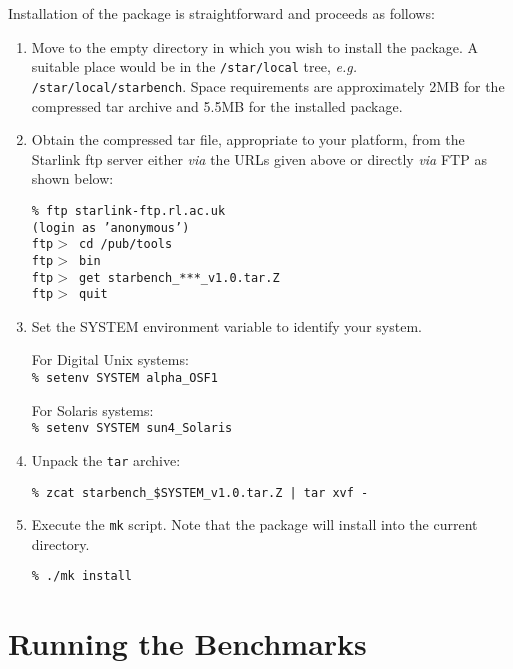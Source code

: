 \documentclass[11pt]{article}
\newcommand{\pkgver}     {v1.0}
\newcommand{\pkgftpdir}  {/pub/tools}
\newcommand{\pkgftpsrv} {starlink-ftp.rl.ac.uk}
\begin{document}
Installation of the package is straightforward and proceeds as follows:

\begin{enumerate}
\item Move to the empty directory in which you wish to install the package.
A suitable place would be in the {\tt /star/local} tree, {\em e.g.}
{\tt /star/local/starbench}. Space requirements are approximately 2MB for
the compressed tar archive and 5.5MB for the installed package.

\item Obtain the compressed tar file, appropriate to your platform, from the Starlink ftp server either {\em via} the URLs given above or directly {\em via} FTP as shown below:

{\tt    \% ftp \pkgftpsrv            \\
        (login as 'anonymous')                 \\
        ftp$>$ cd \pkgftpdir                   \\
        ftp$>$ bin                             \\
        ftp$>$ get starbench\_***\_\pkgver.tar.Z   \\
        ftp$>$ quit }

\item Set the SYSTEM environment variable to identify your system.

For Digital Unix systems: \\
{\tt \% setenv SYSTEM alpha\_OSF1}

For Solaris systems: \\
{\tt \% setenv SYSTEM sun4\_Solaris}

\item Unpack the {\tt tar} archive:

{\tt \% zcat starbench\_\$SYSTEM\_\pkgver.tar.Z | tar xvf - }

\item Execute the {\tt mk} script. Note that the package will install into the
current directory.

{\tt \% ./mk install}
\end{enumerate}


\section{Running the Benchmarks}
\end{document}
